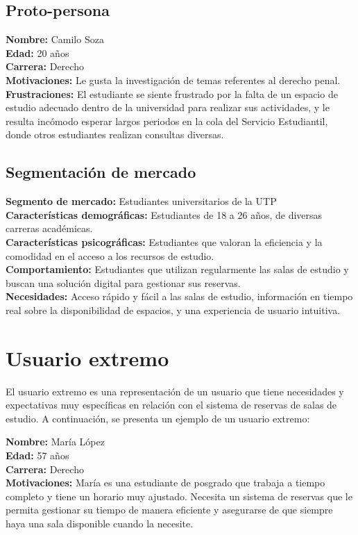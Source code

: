 \documentclass{article}
\begin{document}
\subsection{Proto-persona}

\textbf{Nombre:} Camilo Soza \\
\textbf{Edad:} 20 años \\
\textbf{Carrera:} Derecho \\
\textbf{Motivaciones:} Le gusta la investigación de temas referentes al derecho penal. \\
\textbf{Frustraciones:} El estudiante se siente frustrado por la falta de un espacio de estudio adecuado dentro de la universidad para realizar sus actividades, y le resulta incómodo esperar largos periodos en la cola del Servicio Estudiantil, donde otros estudiantes realizan consultas diversas.

\subsection{Segmentación de mercado}
\textbf{Segmento de mercado:} Estudiantes universitarios de la UTP \\
\textbf{Características demográficas:} Estudiantes de 18 a 26 años, de diversas carreras académicas. \\
\textbf{Características psicográficas:} Estudiantes que valoran la eficiencia y la comodidad en el acceso a los recursos de estudio. \\
\textbf{Comportamiento:} Estudiantes que utilizan regularmente las salas de estudio y buscan una solución digital para gestionar sus reservas. \\
\textbf{Necesidades:} Acceso rápido y fácil a las salas de estudio, información en tiempo real sobre la disponibilidad de espacios, y una experiencia de usuario intuitiva.

\newpage

\section{Usuario extremo}

El usuario extremo es una representación de un usuario que tiene necesidades y expectativas muy específicas en relación con el sistema de reservas de salas de estudio. A continuación, se presenta un ejemplo de un usuario extremo:

\textbf{Nombre:} María López \\
\textbf{Edad:} 57 años \\
\textbf{Carrera:} Derecho \\
\textbf{Motivaciones:} María es una estudiante de posgrado que trabaja a tiempo completo y tiene un horario muy ajustado. Necesita un sistema de reservas que le permita gestionar su tiempo de manera eficiente y asegurarse de que siempre haya una sala disponible cuando la necesite. 
\end{document}
